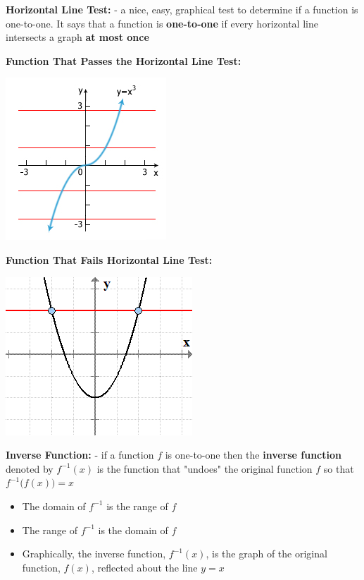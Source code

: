 \documentclass[12pt]{article}
\newenvironment{myindentpar}[1]%
     {\begin{list}{}%
             {\setlength{\leftmargin}{#1}}%
             \item[]%
     }
     {\end{list}}
\begin{document}
\begin{myindentpar}{1cm}
\textbf{Horizontal Line Test:} - a nice, easy, graphical test to determine if a function is one-to-one. It says that a function is \textbf{one-to-one} if every horizontal line intersects a graph \textbf{at most once}

\newpage

\textbf{Function That Passes the Horizontal Line Test:}

\centerline{\includegraphics{PassHLT.jpg}}

\textbf{Function That Fails Horizontal Line Test:}

\centerline{\includegraphics{FailHLT.png}}

\end{myindentpar}

\textbf{Inverse Function:} - if a function $f$ is one-to-one then the \textbf{inverse function} denoted by $f^{-1}(x)$ is the function that "undoes" the original function $f$ so that $f^{-1}\Big(f(x)\Big) = x$ 

\begin{itemize}
\item The domain of $f^{-1}$ is the range of $f$
\item The range of $f^{-1}$ is the domain of $f$
\item Graphically, the inverse function, $f^{-1}(x)$, is the graph of the original function, $f(x)$,  reflected about the line $y=x$
\end{itemize}
\end{document}
